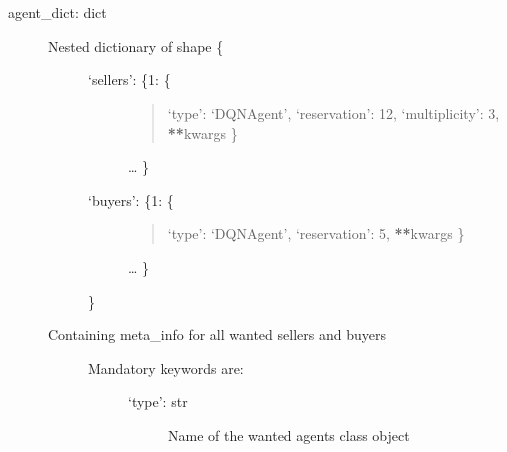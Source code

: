 \documentclass[letterpaper,10pt,english]{sphinxmanual}
\begin{document}
\begin{fulllineitems}
\label{\detokenize{MultiAgentMarketRL:environment.MultiAgentEnvironment}}~

\begin{fulllineitems}
\label{\detokenize{MultiAgentMarketRL:environment.MultiAgentEnvironment.__init__}}~\begin{description}
\item[{agent\_dict: dict}] \leavevmode\begin{description}
\item[{Nested dictionary of shape \{}] \leavevmode\begin{description}
\item[{‘sellers’: \{1: \{}] \leavevmode\begin{quote}

\sphinxAtStartPar
‘type’: ‘DQNAgent’,
‘reservation’: 12,
‘multiplicity’: 3,
{\color{red}\bfseries{}**}kwargs
\}
\end{quote}

\sphinxAtStartPar
…
\}

\item[{‘buyers’: \{1: \{}] \leavevmode\begin{quote}

\sphinxAtStartPar
‘type’: ‘DQNAgent’,
‘reservation’: 5,
{\color{red}\bfseries{}**}kwargs
\}
\end{quote}

\sphinxAtStartPar
…
\}

\end{description}

\sphinxAtStartPar
\}

\item[{Containing meta\_info for all wanted sellers and buyers}] \leavevmode\begin{description}
\item[{Mandatory keywords are:}] \leavevmode\begin{description}
\item[{‘type’: str}] \leavevmode
\sphinxAtStartPar
Name of the wanted agents class object


\end{description}
\end{description}
\end{description}
\end{description}
\end{fulllineitems}
\end{fulllineitems}
\end{document}
